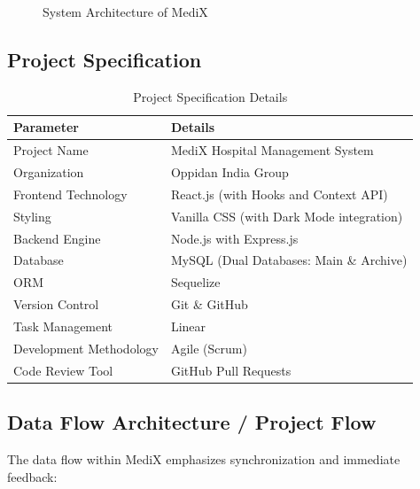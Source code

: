 \documentclass[12pt,a4paper]{article}
\begin{document}
\begin{figure}[H]
    \centering
    \caption{System Architecture of MediX}
    \label{fig:system_architecture}
\end{figure}

\subsection{Project Specification}

\begin{table}[H]
\centering
\caption{Project Specification Details}
\label{tab:project_spec}
\begin{tabular}{|p{4.5cm}|p{8cm}|}
\hline
\textbf{Parameter} & \textbf{Details} \\
\hline
Project Name & MediX Hospital Management System \\
\hline
Organization & Oppidan India Group \\
\hline
Frontend Technology & React.js (with Hooks and Context API) \\
\hline
Styling & Vanilla CSS (with Dark Mode integration) \\
\hline
Backend Engine & Node.js with Express.js \\
\hline
Database & MySQL (Dual Databases: Main \& Archive) \\
\hline
ORM & Sequelize \\
\hline
Version Control & Git \& GitHub \\
\hline
Task Management & Linear \\
\hline
Development Methodology & Agile (Scrum) \\
\hline
Code Review Tool & GitHub Pull Requests \\
\hline
\end{tabular}
\end{table}

\subsection{Data Flow Architecture / Project Flow}

The data flow within MediX emphasizes synchronization and immediate feedback:
\end{document}
